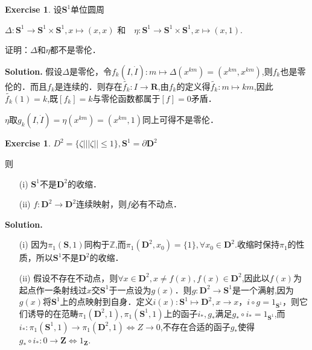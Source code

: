 \documentclass[a4paper]{book}
\newenvironment{solution}%
{\noindent\textbf{Solution.}}%
{\qedhere}
\numberwithin{equation}{chapter}
\theoremstyle{definition}
\newtheorem{exc}[exm]{Exercise}
\begin{document}
\begin{multicols}{2}
\setlength{\columnseprule}{0.2pt}  

\begin{exc}
	设$ \mathbf{S}^1 $单位圆周
	
	$\Delta: \mathbf{S}^1 \rightarrow  \mathbf{S}^1 \times  \mathbf{S}^1, x \mapsto (x,x) \text{ 和　} \eta:  \mathbf{S}^1 \rightarrow  \mathbf{S}^1 \times  \mathbf{S}^1, x \mapsto (x,1) $.
	
	证明：$ \Delta $和$ \eta $都不是零伦．
\end{exc}

\begin{solution}
	假设$ \Delta $是零伦，令$ f_k(I,\dot{I}): m \mapsto \Delta(x^{km}) = (x^{km}, x^{km}) $,则$ f_k $也是零伦的．而且$ f_k $是连续的．则存在$ \widetilde{f_k}: I \rightarrow \mathbf{R} $,由$ f_k $的定义得$ \widetilde{f_k}: m \mapsto km$,因此$ \widetilde{f_k}(1) = k $,既$ [f_k] = k $与零伦函数都属于$ [f] =0 $矛盾．
	
	$ \eta $取$ g_k(I,\dot{I}) = \eta(x^{km}) = (x^{km},　1) $同上可得不是零伦．
\end{solution}

\begin{exc}
	$ D^2 = \{ \zeta \big| ||\zeta|| \leq 1 \}, \mathbf{S}^1 = \partial \mathbf{D}^2 $
	
	则\begin{itemize}
		\item [(i)] $ \mathbf{S}^1 $不是$ \mathbf{D}^2 $的收缩．
		\item [(ii)] $ f: \mathbf{D}^2 \rightarrow \mathbf{D}^2 $连续映射，则$ f $必有不动点．
	\end{itemize}
\end{exc}

\begin{solution}
	\begin{itemize}
		\item [(i)] 因为$ \pi_1 (\mathbf{S}, 1) $同构于$ \mathbb{Z} $,而$ \pi_1 ( \mathbf{D}^2 , x_0) = \{1\}, \forall x_0 \in  \mathbf{D}^2 $.收缩时保持$ \pi_1 $的性质，所以$ \mathbf{S}^1 $不是$ \mathbf{D}^2 $的收缩．
		
		\item [(ii)] 假设不存在不动点，则$ \forall x \in \mathbf{D}^2, x \neq f(x), f(x) \in  \mathbf{D}^2$,因此以$ f(x) $为起点作一条射线过$ x $交$ \mathbf{S}^1 $于一点设为$ g(x) $．则$ g: \mathbf{D}^2 \rightarrow \mathbf{S}^1 $是一个满射,因为$ g(x) $将$ \mathbf{S}^1 $上的点映射到自身．定义$ i(x): \mathbf{S}^1 \mapsto \mathbf{D}^2, x \rightarrow x $，$ i \circ g = 1_{\mathbf{S}^1} $，则它们诱导的在范畴$ \pi_1(\mathbf{D}^2, 1), \pi_1(\mathbf{S}^1, 1) $上的函子$ i_*, g_* $满足$ g_* \circ i_* = 1_{\mathbf{S}^1} $,而$ i_*:  \pi_1(\mathbf{S}^1, 1) \rightarrow \pi_1(\mathbf{D}^2, 1) \Longleftrightarrow Z \rightarrow {0} $,不存在合适的函子$ g_* $使得$ g_* \circ i_*: {0} \rightarrow \mathbf{Z} \Longleftrightarrow 1_{\mathbf{Z}} $.
	\end{itemize}
\end{solution}


\end{multicols}
\end{document}
